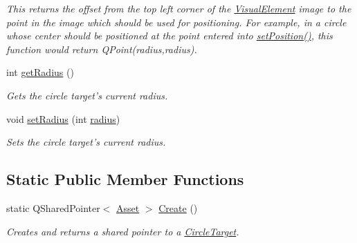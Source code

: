 \begin{DoxyCompactItemize}
\begin{DoxyCompactList}\small\item\em This returns the offset from the top left corner of the \hyperlink{struct_picto_1_1_visual_element}{Visual\-Element} image to the point in the image which should be used for positioning. For example, in a circle whose center should be positioned at the point entered into \hyperlink{struct_picto_1_1_visual_element_a454cc96862097e96a0b0f1d2c83e23ed}{set\-Position()}, this function would return Q\-Point(radius,radius). \end{DoxyCompactList}\item 
\hypertarget{class_picto_1_1_circle_target_a8252c7eec34f038fc06e635791ff3ede}{int \hyperlink{class_picto_1_1_circle_target_a8252c7eec34f038fc06e635791ff3ede}{get\-Radius} ()}\label{class_picto_1_1_circle_target_a8252c7eec34f038fc06e635791ff3ede}

\begin{DoxyCompactList}\small\item\em Gets the circle target's current radius. \end{DoxyCompactList}\item 
\hypertarget{class_picto_1_1_circle_target_a904a5d6d32a3d55fb0db76087c097696}{void \hyperlink{class_picto_1_1_circle_target_a904a5d6d32a3d55fb0db76087c097696}{set\-Radius} (int \hyperlink{class_picto_1_1_circle_target_a92b430d79fa5aae82e025c7c7e3b6f68}{radius})}\label{class_picto_1_1_circle_target_a904a5d6d32a3d55fb0db76087c097696}

\begin{DoxyCompactList}\small\item\em Sets the circle target's current radius. \end{DoxyCompactList}\end{DoxyCompactItemize}
\subsection*{Static Public Member Functions}
\begin{DoxyCompactItemize}
\item 
\hypertarget{class_picto_1_1_circle_target_a5971851d7ed6110365847765876e680a}{static Q\-Shared\-Pointer$<$ \hyperlink{class_picto_1_1_asset}{Asset} $>$ \hyperlink{class_picto_1_1_circle_target_a5971851d7ed6110365847765876e680a}{Create} ()}\label{class_picto_1_1_circle_target_a5971851d7ed6110365847765876e680a}

\begin{DoxyCompactList}\small\item\em Creates and returns a shared pointer to a \hyperlink{class_picto_1_1_circle_target}{Circle\-Target}. \end{DoxyCompactList}\end{DoxyCompactItemize}
